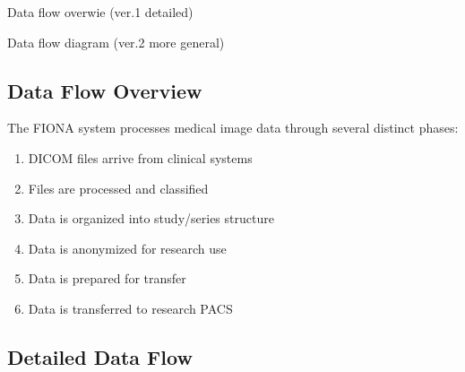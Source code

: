 \documentclass[letterpaper,10pt,english]{sphinxmanual}
\begin{document}
\sphinxAtStartPar
Data flow overwie (ver.1 \sphinxhyphen{} detailed)


\sphinxAtStartPar
Data flow diagram (ver.2 \sphinxhyphen{} more general)



\subsection{Data Flow Overview}
\label{\detokenize{Architecture/data-flow:data-flow-overview}}

\sphinxAtStartPar
The FIONA system processes medical image data through several distinct phases:
\begin{enumerate}
%
\item {} 
\sphinxAtStartPar
{} \sphinxhyphen{} DICOM files arrive from clinical systems

\item {} 
\sphinxAtStartPar
{} \sphinxhyphen{} Files are processed and classified

\item {} 
\sphinxAtStartPar
{} \sphinxhyphen{} Data is organized into study/series structure

\item {} 
\sphinxAtStartPar
{} \sphinxhyphen{} Data is anonymized for research use

\item {} 
\sphinxAtStartPar
{} \sphinxhyphen{} Data is prepared for transfer

\item {} 
\sphinxAtStartPar
{} \sphinxhyphen{} Data is transferred to research PACS

\end{enumerate}


\subsection{Detailed Data Flow}
\label{\detokenize{Architecture/data-flow:detailed-data-flow}}
\end{document}
